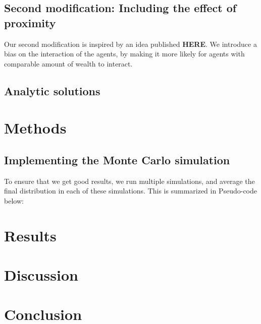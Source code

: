 \documentclass[a4paper, 10pt]{article}
\begin{document}
\subsection{Second modification: Including the effect of proximity}
Our second modification is inspired by an idea published \textbf{HERE}. We introduce a bias on the interaction of the agents, by making it more likely for agents with comparable amount of wealth to interact. 
\subsection{Analytic solutions}

\section{Methods}
\subsection{Implementing the Monte Carlo simulation}
To ensure that we get good results, we run multiple simulations, and average the final distribution in each of these simulations. This is summarized in Pseudo-code below:

\section{Results}
\section{Discussion}
\section{Conclusion}
\end{document}
